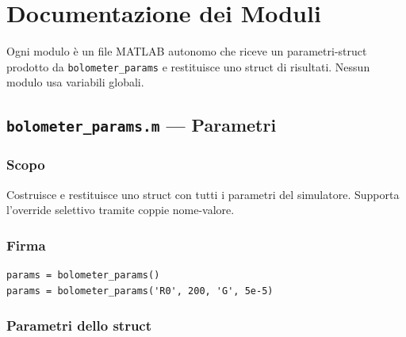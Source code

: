 \documentclass[11pt,a4paper]{article}
\begin{document}
\section{Documentazione dei Moduli}

Ogni modulo è un file MATLAB autonomo che riceve un parametri-struct
prodotto da \texttt{bolometer\_params} e restituisce uno struct di risultati.
Nessun modulo usa variabili globali.

\subsection{\texttt{bolometer\_params.m} --- Parametri}

\subsubsection*{Scopo}
Costruisce e restituisce uno struct con tutti i parametri del simulatore.
Supporta l'override selettivo tramite coppie nome-valore.

\subsubsection*{Firma}
\begin{lstlisting}
params = bolometer_params()
params = bolometer_params('R0', 200, 'G', 5e-5)
\end{lstlisting}

\subsubsection*{Parametri dello struct}
\end{document}
